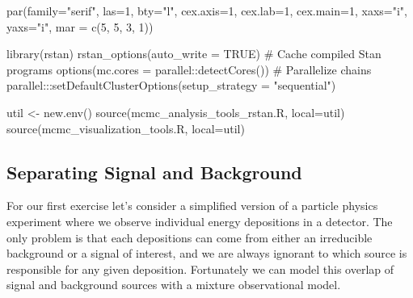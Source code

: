 \documentclass[
  letterpaper,
  DIV=11,
  numbers=noendperiod]{scrartcl}
\newenvironment{Shaded}{\begin{snugshade}}{\end{snugshade}}
\newcommand{\AttributeTok}[1]{\textcolor[rgb]{0.40,0.45,0.13}{#1}}
\newcommand{\CommentTok}[1]{\textcolor[rgb]{0.37,0.37,0.37}{#1}}
\newcommand{\ConstantTok}[1]{\textcolor[rgb]{0.56,0.35,0.01}{#1}}
\newcommand{\DecValTok}[1]{\textcolor[rgb]{0.68,0.00,0.00}{#1}}
\newcommand{\FunctionTok}[1]{\textcolor[rgb]{0.28,0.35,0.67}{#1}}
\newcommand{\NormalTok}[1]{\textcolor[rgb]{0.00,0.23,0.31}{#1}}
\newcommand{\OtherTok}[1]{\textcolor[rgb]{0.00,0.23,0.31}{#1}}
\newcommand{\SpecialCharTok}[1]{\textcolor[rgb]{0.37,0.37,0.37}{#1}}
\newcommand{\StringTok}[1]{\textcolor[rgb]{0.13,0.47,0.30}{#1}}
\begin{document}
\begin{Shaded}
\begin{Highlighting}[]
\FunctionTok{par}\NormalTok{(}\AttributeTok{family=}\StringTok{"serif"}\NormalTok{, }\AttributeTok{las=}\DecValTok{1}\NormalTok{, }\AttributeTok{bty=}\StringTok{"l"}\NormalTok{,}
    \AttributeTok{cex.axis=}\DecValTok{1}\NormalTok{, }\AttributeTok{cex.lab=}\DecValTok{1}\NormalTok{, }\AttributeTok{cex.main=}\DecValTok{1}\NormalTok{,}
    \AttributeTok{xaxs=}\StringTok{"i"}\NormalTok{, }\AttributeTok{yaxs=}\StringTok{"i"}\NormalTok{, }\AttributeTok{mar =} \FunctionTok{c}\NormalTok{(}\DecValTok{5}\NormalTok{, }\DecValTok{5}\NormalTok{, }\DecValTok{3}\NormalTok{, }\DecValTok{1}\NormalTok{))}

\FunctionTok{library}\NormalTok{(rstan)}
\FunctionTok{rstan\_options}\NormalTok{(}\AttributeTok{auto\_write =} \ConstantTok{TRUE}\NormalTok{)            }\CommentTok{\# Cache compiled Stan programs}
\FunctionTok{options}\NormalTok{(}\AttributeTok{mc.cores =}\NormalTok{ parallel}\SpecialCharTok{::}\FunctionTok{detectCores}\NormalTok{()) }\CommentTok{\# Parallelize chains}
\NormalTok{parallel}\SpecialCharTok{:::}\FunctionTok{setDefaultClusterOptions}\NormalTok{(}\AttributeTok{setup\_strategy =} \StringTok{"sequential"}\NormalTok{)}
\end{Highlighting}
\end{Shaded}

\begin{Shaded}
\begin{Highlighting}[]
\NormalTok{util }\OtherTok{\textless{}{-}} \FunctionTok{new.env}\NormalTok{()}
\FunctionTok{source}\NormalTok{(}\StringTok{\textquotesingle{}mcmc\_analysis\_tools\_rstan.R\textquotesingle{}}\NormalTok{, }\AttributeTok{local=}\NormalTok{util)}
\FunctionTok{source}\NormalTok{(}\StringTok{\textquotesingle{}mcmc\_visualization\_tools.R\textquotesingle{}}\NormalTok{, }\AttributeTok{local=}\NormalTok{util)}
\end{Highlighting}
\end{Shaded}

\subsection{Separating Signal and
Background}\label{separating-signal-and-background}

For our first exercise let's consider a simplified version of a particle
physics experiment where we observe individual energy depositions in a
detector. The only problem is that each depositions can come from either
an irreducible background or a signal of interest, and we are always
ignorant to which source is responsible for any given deposition.
Fortunately we can model this overlap of signal and background sources
with a mixture observational model.
\end{document}
